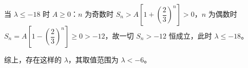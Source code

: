 \begin{answer}
当 $\lambda\leqslant-18$ 时 $A\geqslant0$：$n$ 为奇数时 $S_n>A\left[1+\left(\dfrac23\right)^n\right]>0$，$n$ 为偶数时 $S_n=A\left[1-\left(\dfrac23\right)^n\right]\geqslant0>-12$，故一切 $S_n>-12$ 恒成立，此时 $\lambda\leqslant-18$。

综上，存在这样的 $\lambda$，其取值范围为 $\lambda<-6$。


\end{answer}